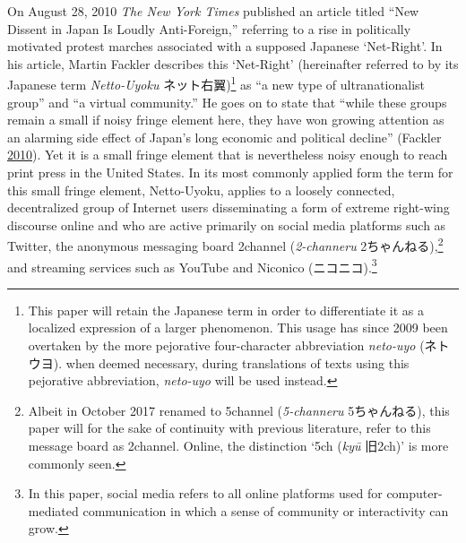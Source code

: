 \documentclass[10pt,british,A4paper,oneside]{memoir}
\begin{document}
On August 28, 2010 \emph{The New York Times} published an article titled
``New Dissent in Japan Is Loudly Anti-Foreign,'' referring to a rise in
politically motivated protest marches associated with a supposed
Japanese `Net-Right'. In his article, Martin Fackler describes this
`Net-Right' (hereinafter referred to by its Japanese term
\emph{Netto-Uyoku} ネット右翼)\footnote{This paper will retain the
  Japanese term in order to differentiate it as a localized expression
  of a larger phenomenon. This usage has since 2009 been overtaken by
  the more pejorative four-character abbreviation \emph{neto-uyo}
  (ネトウヨ). when deemed necessary, during translations of texts using
  this pejorative abbreviation, \emph{neto-uyo} will be used
  instead.} as ``a new type of ultranationalist group'' and ``a virtual
community.'' He goes on to state that ``while these groups remain a
small if noisy fringe element here, they have won growing attention as
an alarming side effect of Japan's long economic and political decline''
(Fackler \protect\hyperlink{ref-fackler_new_2010-1}{2010}). Yet it is a
small fringe element that is nevertheless noisy enough to reach print
press in the United States. In its most commonly applied form the term for this small fringe element,
Netto-Uyoku, applies to a loosely connected, decentralized group of
Internet users disseminating a form of extreme right-wing discourse
online and who are active primarily on social media platforms such as
Twitter, the anonymous messaging board 2channel (\emph{2-channeru}
2ちゃんねる),\footnote{Albeit in October 2017 renamed to 5channel
  (\emph{5-channeru} 5ちゃんねる), this paper will for the sake of
  continuity with previous literature, refer to this message board as
  2channel. Online, the distinction `5ch (\emph{kyū} 旧2ch)' is more commonly seen.}
and streaming services such as YouTube and Niconico
(ニコニコ).\footnote{In this paper, social media refers to all online
  platforms used for computer-mediated communication in which a sense of
  community or interactivity can grow.}
\end{document}
